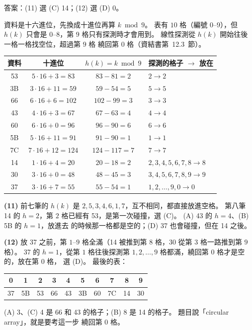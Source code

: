 \begin{pastsoln}
答案：(11) 選 (C) 14；(12) 選 (D) 0。

資料是十六進位，先換成十進位再算 $k \bmod 9$。 表有 $10$ 格（編號 $0$--$9$），但 $h(k)$ 只會是
$0$--$8$，第 $9$ 格只有探測時才會用到。 線性探測從 $h(k)$ 開始往後一格一格找空位，超過第 $9$ 格
繞回第 $0$ 格（資結書第~12.3~節）。

\begin{center}
\begin{tabular}{cccl}
\toprule
資料 & 十進位 & $h(k) = k \bmod 9$ & 探測的格子 $\to$ 放在 \\
\midrule
53 & $5 \cdot 16 + 3 = 83$ & $83 - 81 = 2$ & $2 \to 2$ \\
3B & $3 \cdot 16 + 11 = 59$ & $59 - 54 = 5$ & $5 \to 5$ \\
66 & $6 \cdot 16 + 6 = 102$ & $102 - 99 = 3$ & $3 \to 3$ \\
43 & $4 \cdot 16 + 3 = 67$ & $67 - 63 = 4$ & $4 \to 4$ \\
60 & $6 \cdot 16 + 0 = 96$ & $96 - 90 = 6$ & $6 \to 6$ \\
5B & $5 \cdot 16 + 11 = 91$ & $91 - 90 = 1$ & $1 \to 1$ \\
7C & $7 \cdot 16 + 12 = 124$ & $124 - 117 = 7$ & $7 \to 7$ \\
14 & $1 \cdot 16 + 4 = 20$ & $20 - 18 = 2$ & $2, 3, 4, 5, 6, 7, 8 \to 8$ \\
30 & $3 \cdot 16 + 0 = 48$ & $48 - 45 = 3$ & $3, 4, 5, 6, 7, 8, 9 \to 9$ \\
37 & $3 \cdot 16 + 7 = 55$ & $55 - 54 = 1$ & $1, 2, \ldots, 9, 0 \to 0$ \\
\bottomrule
\end{tabular}
\end{center}

\textbf{(11)} 前七筆的 $h(k)$ 是 $2, 5, 3, 4, 6, 1, 7$，互不相同，都直接放進空格。 第八筆 14 的
$h = 2$，第 $2$ 格已經有 53，是第一次碰撞，選 (C)。 (A) 43 的 $h = 4$、(B) 5B 的 $h = 1$，放進去
的時候那一格都是空的；(D) 37 也會碰撞，但在 14 之後。

\textbf{(12)} 放 37 之前，第 $1$--$9$ 格全滿（14 被推到第 $8$ 格，30 從第 $3$ 格一路推到第 $9$ 格）。
37 的 $h = 1$，從第 $1$ 格往後探測第 $1, 2, \ldots, 9$ 格都滿，繞回第 $0$ 格才是空的，放在第 $0$ 格，
選 (D)。 最後的表：
\begin{center}
\begin{tabular}{*{10}{c}}
\toprule
0 & 1 & 2 & 3 & 4 & 5 & 6 & 7 & 8 & 9 \\
\midrule
37 & 5B & 53 & 66 & 43 & 3B & 60 & 7C & 14 & 30 \\
\bottomrule
\end{tabular}
\end{center}
(A) 3、(C) 4 是 66 和 43 的格子；(B) 8 是 14 的格子。 題目說「circular array」，就是要考這一步
繞回第 $0$ 格。

\end{pastsoln}
